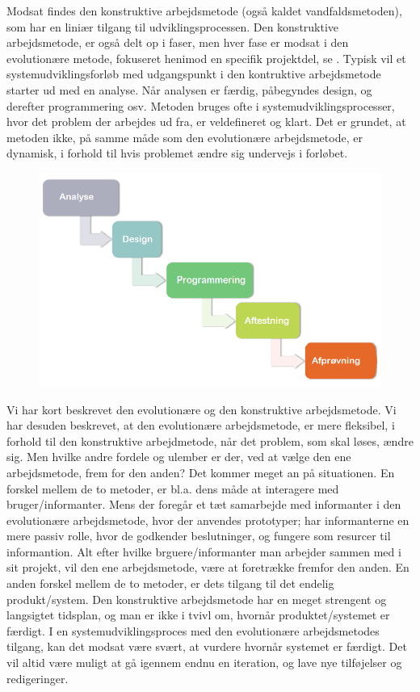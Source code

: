 Modsat findes den konstruktive arbejdsmetode (også kaldet vandfaldsmetoden), som har en liniær tilgang til udviklingsprocessen. Den konstruktive arbejdsmetode, er også delt op i faser, men hver fase er modsat i den evolutionære metode, fokuseret henimod en specifik projektdel, se . Typisk vil et systemudviklingsforløb med udgangspunkt i den kontruktive arbejdsmetode starter ud med en analyse. Når analysen er færdig, påbegyndes design, og derefter programmering osv. Metoden bruges ofte i systemudviklingsprocesser, hvor det problem der arbejdes ud fra, er veldefineret og klart. Det er grundet, at metoden ikke, på samme måde som den evolutionære arbejdsmetode, er dynamisk, i forhold til hvis problemet ændre sig undervejs i forløbet.     

\begin{figure}[h]
		\centering
		\includegraphics[scale=0.5]{billeder/konstruktivemetode.png}
  		\label{fig:konstruktivemetode}
\end{figure}

Vi har kort beskrevet den evolutionære og den konstruktive arbejdsmetode. Vi har desuden beskrevet, at den evolutionære arbejdsmetode, er mere fleksibel, i forhold til den konstruktive arbejdmetode, når det problem, som skal løses, ændre sig. Men hvilke andre fordele og ulember er der, ved at vælge den ene arbejdsmetode, frem for den anden? Det kommer meget an på situationen. En forskel mellem de to metoder, er bl.a. dens måde at interagere med bruger/informanter. Mens der foregår et tæt samarbejde med informanter i den evolutionære arbejdsmetode, hvor der anvendes prototyper; har informanterne en mere passiv rolle, hvor de godkender beslutninger, og fungere som resurcer til informantion. Alt efter hvilke brguere/informanter man arbejder sammen med i sit projekt, vil den ene arbejdsmetode, være at foretrække fremfor den anden. En anden forskel mellem de to metoder, er dets tilgang til det endelig produkt/system. Den konstruktive arbejdsmetode har en meget strengent og langsigtet tidsplan, og man er ikke i tvivl om, hvornår produktet/systemet er færdigt. I en systemudviklingsproces med den evolutionære arbejdsmetodes tilgang, kan det modsat være svært, at vurdere  hvornår systemet er færdigt. Det vil altid være muligt at gå igennem endnu en iteration, og lave nye tilføjelser og redigeringer.


